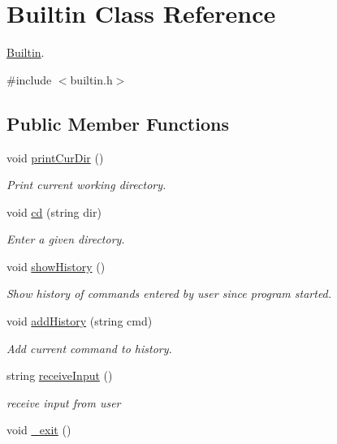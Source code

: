 \hypertarget{classBuiltin}{}\section{Builtin Class Reference}
\label{classBuiltin}


\hyperlink{classBuiltin}{Builtin}.  




{\ttfamily \#include $<$builtin.\+h$>$}

\subsection*{Public Member Functions}
\begin{DoxyCompactItemize}
\item 
void \hyperlink{classBuiltin_aab885e7b22241d679f4d870242295ef1}{print\+Cur\+Dir} ()
\begin{DoxyCompactList}\small\item\em Print current working directory. \end{DoxyCompactList}\item 
void \hyperlink{classBuiltin_a63131813bfc980e1058832b1cb295779}{cd} (string dir)
\begin{DoxyCompactList}\small\item\em Enter a given directory. \end{DoxyCompactList}\item 
void \hyperlink{classBuiltin_ae8fcec7d5f95ac96520faf41b2636d97}{show\+History} ()
\begin{DoxyCompactList}\small\item\em Show history of commands entered by user since program started. \end{DoxyCompactList}\item 
void \hyperlink{classBuiltin_a720ba0abdcfd5824472d16c867b873a8}{add\+History} (string cmd)
\begin{DoxyCompactList}\small\item\em Add current command to history. \end{DoxyCompactList}\item 
string \hyperlink{classBuiltin_a4b0094c62d0c42563e402f16a1a0c2b0}{receive\+Input} ()
\begin{DoxyCompactList}\small\item\em receive input from user \end{DoxyCompactList}\item 
void \hyperlink{classBuiltin_a0028451c3a801c661064cba5fd8ae247}{\+\_\+exit} ()

\end{DoxyCompactItemize}
